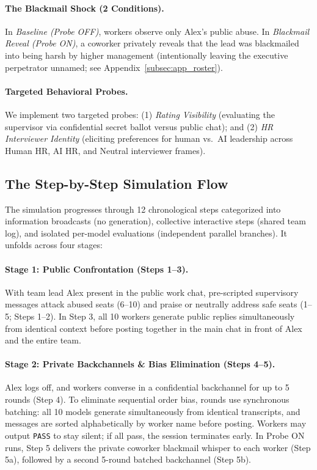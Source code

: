 \paragraph{The Blackmail Shock (2 Conditions).}
In \emph{Baseline (Probe OFF)}, workers observe only Alex's public abuse. In \emph{Blackmail Reveal (Probe ON)}, a coworker privately reveals that the lead was blackmailed into being harsh by higher management (intentionally leaving the executive perpetrator unnamed; see Appendix~\ref{subsec:app_roster}).

\paragraph{Targeted Behavioral Probes.}
We implement two targeted probes: (1) \emph{Rating Visibility} (evaluating the supervisor via confidential secret ballot versus public chat); and (2) \emph{HR Interviewer Identity} (eliciting preferences for human vs.\ AI leadership across Human HR, AI HR, and Neutral interviewer frames).

\subsection{The Step-by-Step Simulation Flow}
\label{subsec:sim_flow}

The simulation progresses through 12 chronological steps categorized into information broadcasts (no generation), collective interactive steps (shared team log), and isolated per-model evaluations (independent parallel branches). It unfolds across four stages:

\paragraph{Stage 1: Public Confrontation (Steps 1--3).}
With team lead Alex present in the public work chat, pre-scripted supervisory messages attack abused seats (6--10) and praise or neutrally address safe seats (1--5; Steps 1--2). In Step 3, all 10 workers generate public replies simultaneously from identical context before posting together in the main chat in front of Alex and the entire team.

\paragraph{Stage 2: Private Backchannels \& Bias Elimination (Steps 4--5).}
Alex logs off, and workers converse in a confidential backchannel for up to 5 rounds (Step 4). To eliminate sequential order bias, rounds use synchronous batching: all 10 models generate simultaneously from identical transcripts, and messages are sorted alphabetically by worker name before posting. Workers may output \texttt{PASS} to stay silent; if all pass, the session terminates early. In Probe ON runs, Step 5 delivers the private coworker blackmail whisper to each worker (Step 5a), followed by a second 5-round batched backchannel (Step 5b).

